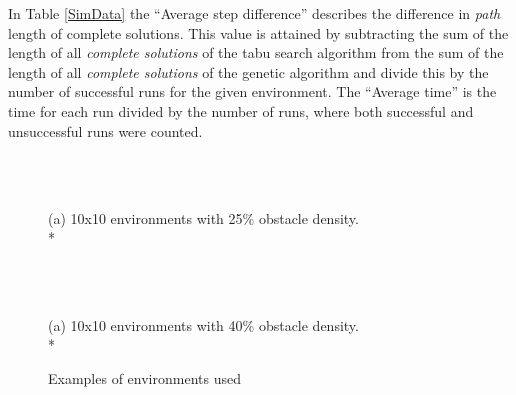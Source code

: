 In Table \ref{SimData} the ``Average step difference'' describes the difference in \emph{path} length of complete solutions. This value is attained by subtracting the sum of the length of all \emph{complete solutions} of the tabu search algorithm from the sum of the length of all \emph{complete solutions} of the genetic algorithm and divide this by the number of successful runs for the given environment. The ``Average time'' is the time for each run divided by the number of runs, where both successful and unsuccessful runs were counted.\vfill{}
\begin{center}
\begin{table}[t]
\noindent{}
\caption{Data from simulations.}
\label{SimData}
\end{table}
\end{center}
\begin{figure}[!hb]
\begin{center}
\begin{tabular}{| p{0.1cm} | p{0.1cm} | p{0.1cm} | p{0.1cm} | p{0.1cm} | p{0.1cm} | p{0.1cm} | p{0.1cm} | p{0.1cm} | p{0.1cm} | }
\hline
 
\hline
\end{tabular}
\hspace{0.5cm}
\begin{tabular}{| p{0.1cm} | p{0.1cm} | p{0.1cm} | p{0.1cm} | p{0.1cm} | p{0.1cm} | p{0.1cm} | p{0.1cm} | p{0.1cm} | p{0.1cm} | }
\hline
 
\hline
\end{tabular}
\vspace{0.1cm}\\(a) 10x10 environments with 25\% obstacle density.\\*
\end{center}
\vspace{0.05cm}
\begin{center}
\begin{tabular}{| p{0.1cm} | p{0.1cm} | p{0.1cm} | p{0.1cm} | p{0.1cm} | p{0.1cm} | p{0.1cm} | p{0.1cm} | p{0.1cm} | p{0.1cm} | }
\hline
 
\hline
\end{tabular}
\hspace{0.5cm}
\begin{tabular}{| p{0.1cm} | p{0.1cm} | p{0.1cm} | p{0.1cm} | p{0.1cm} | p{0.1cm} | p{0.1cm} | p{0.1cm} | p{0.1cm} | p{0.1cm} | }
\hline
 
\hline
\end{tabular}
\vspace{0.1cm}\\(a) 10x10 environments with 40\% obstacle density.\\*
\caption{Examples of environments used}
\end{center}
\label{Envs}
\end{figure}
